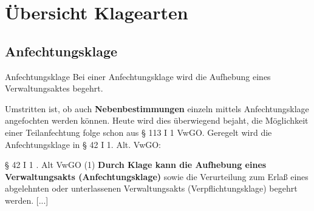 \documentclass{article}
\begin{document}
\section{Übersicht Klagearten}
\subsection{Anfechtungsklage}
\begin{definition}{Anfechtungsklage}
Bei einer Anfechtungsklage wird die Aufhebung eines Verwaltungsaktes begehrt.
\end{definition}

Umstritten ist, ob auch \textbf{Nebenbestimmungen} einzeln mittels Anfechtungsklage angefochten werden können. Heute wird dies überwiegend bejaht, die Möglichkeit einer Teilanfechtung folge schon aus § 113 I 1 VwGO. Geregelt wird die Anfechtungsklage in § 42 I 1. Alt. VwGO:
\begin{legal-text}{§ 42 I 1 . Alt VwGO}
(1) \textbf{Durch Klage kann die Aufhebung eines Verwaltungsakts (Anfechtungsklage)} sowie die Verurteilung zum Erlaß eines abgelehnten oder unterlassenen Verwaltungsakts (Verpflichtungsklage) begehrt werden.
[...]
\end{legal-text}
\end{document}
